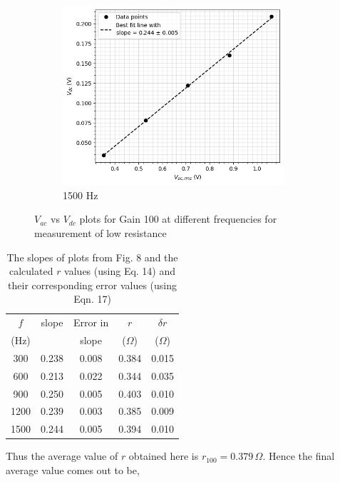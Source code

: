     \begin{figure}[H]
    \ContinuedFloat
    \begin{subfigure}{\linewidth}
    \includegraphics[width=0.9\textwidth]{images/d5.png}
    \caption{1500 Hz}
    \end{subfigure}
    
    \caption{$V_{ac}$ vs $V_{dc}$ plots for Gain 100 at different frequencies for measurement of low resistance}
\end{figure}

\begin{table}[H]
    \centering
    \begin{tabular}{|c|c|c|c|c|} \hline
        $f$ & slope & Error in  & $r$ & $\delta r$ \\
        (Hz) & & slope & ($\Omega$) & ($\Omega$) \\\hline
        300 & 0.238 & 0.008 & 0.384 &        0.015 \\
        600 & 0.213 & 0.022 & 0.344 &        0.035 \\
        900 & 0.250 & 0.005 & 0.403 &        0.010 \\
        1200 & 0.239 & 0.003 & 0.385 &        0.009 \\
        1500 & 0.244 & 0.005 & 0.394 &        0.010 \\\hline
    \end{tabular}
    \caption{The slopes of plots from Fig. 8 and the calculated $r$ values (using Eq. 14) and their corresponding error values (using Eqn. 17)}
\end{table}

Thus the average value of $r$ obtained here is $r_{100}=0.379\,\Omega$.
Hence the final average value comes out to be,

